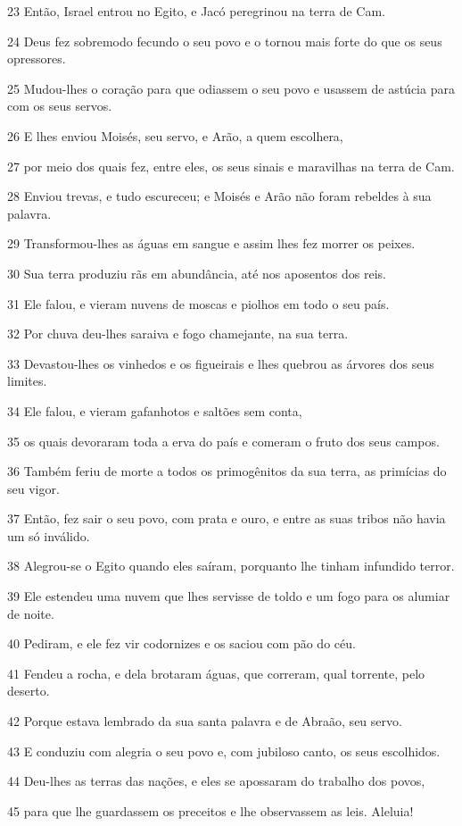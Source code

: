 \par 23 Então, Israel entrou no Egito, e Jacó peregrinou na terra de Cam.
\par 24 Deus fez sobremodo fecundo o seu povo e o tornou mais forte do que os seus opressores.
\par 25 Mudou-lhes o coração para que odiassem o seu povo e usassem de astúcia para com os seus servos.
\par 26 E lhes enviou Moisés, seu servo, e Arão, a quem escolhera,
\par 27 por meio dos quais fez, entre eles, os seus sinais e maravilhas na terra de Cam.
\par 28 Enviou trevas, e tudo escureceu; e Moisés e Arão não foram rebeldes à sua palavra.
\par 29 Transformou-lhes as águas em sangue e assim lhes fez morrer os peixes.
\par 30 Sua terra produziu rãs em abundância, até nos aposentos dos reis.
\par 31 Ele falou, e vieram nuvens de moscas e piolhos em todo o seu país.
\par 32 Por chuva deu-lhes saraiva e fogo chamejante, na sua terra.
\par 33 Devastou-lhes os vinhedos e os figueirais e lhes quebrou as árvores dos seus limites.
\par 34 Ele falou, e vieram gafanhotos e saltões sem conta,
\par 35 os quais devoraram toda a erva do país e comeram o fruto dos seus campos.
\par 36 Também feriu de morte a todos os primogênitos da sua terra, as primícias do seu vigor.
\par 37 Então, fez sair o seu povo, com prata e ouro, e entre as suas tribos não havia um só inválido.
\par 38 Alegrou-se o Egito quando eles saíram, porquanto lhe tinham infundido terror.
\par 39 Ele estendeu uma nuvem que lhes servisse de toldo e um fogo para os alumiar de noite.
\par 40 Pediram, e ele fez vir codornizes e os saciou com pão do céu.
\par 41 Fendeu a rocha, e dela brotaram águas, que correram, qual torrente, pelo deserto.
\par 42 Porque estava lembrado da sua santa palavra e de Abraão, seu servo.
\par 43 E conduziu com alegria o seu povo e, com jubiloso canto, os seus escolhidos.
\par 44 Deu-lhes as terras das nações, e eles se apossaram do trabalho dos povos,
\par 45 para que lhe guardassem os preceitos e lhe observassem as leis. Aleluia!


